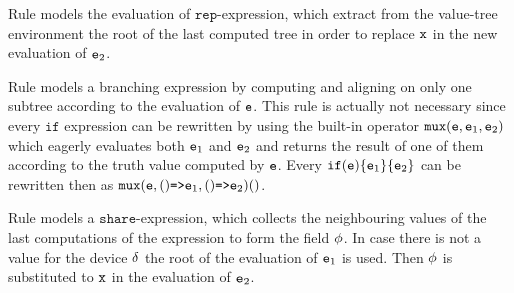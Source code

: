 Rule  models the evaluation of $\mathtt{rep}$-expression, which extract from the value-tree environment the root of the last computed tree in order to replace $\mathtt{x}$ in the new evaluation of $\mathtt{e}_2$.

Rule  models a branching expression by computing and aligning on only one subtree according to the evaluation of $\mathtt{e}$. This rule is actually not necessary since every $\mathtt{if}$ expression can be rewritten by using the built-in operator $\mathtt{mux}(\mathtt{e},\mathtt{e}_1,\mathtt{e}_2)$ which eagerly evaluates both $\mathtt{e}_1$ and $\mathtt{e}_2$ and returns the result of one of them according to the truth value computed by $\mathtt{e}$. Every $\mathtt{if}(\mathtt{e})\{\mathtt{e}_1\}\{\mathtt{e}_2\}$ can be rewritten then as $\mathtt{mux}(\mathtt{e},()\mathrm{ \texttt{=>}\mathtt{e} }_1,()\mathrm{ \texttt{=>}\mathtt{e} }_2)()$.

Rule  models a $\mathtt{share}$-expression, which collects the neighbouring values of the last computations of the expression to form the field $\phi$. In case there is not a value for the device $\delta$ the root of the evaluation of $\mathtt{e}_1$ is used. Then $\phi$ is substituted to $\mathtt{x}$ in the evaluation of $\mathtt{e}_2$.

